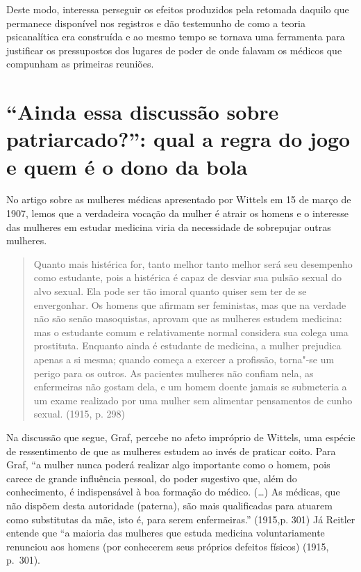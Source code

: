 Deste modo, interessa perseguir os efeitos produzidos pela retomada
daquilo que permanece disponível nos registros e dão testemunho de como
a teoria psicanalítica era construída e ao mesmo tempo se tornava uma
ferramenta para justificar os pressupostos dos lugares de poder de onde
falavam os médicos que compunham as primeiras reuniões.

\section{``Ainda essa discussão sobre patriarcado?'': qual a regra do jogo
e quem é o dono da bola}

No artigo sobre as mulheres médicas apresentado por Wittels em 15 de
março de 1907, lemos que a verdadeira vocação da mulher é atrair os
homens e o interesse das mulheres em estudar medicina viria da
necessidade de sobrepujar outras mulheres.

\begin{quote}
Quanto mais histérica for, tanto melhor tanto melhor será seu desempenho
como estudante, pois a histérica é capaz de desviar sua pulsão sexual do
alvo sexual. Ela pode ser tão imoral quanto quiser sem ter de se
envergonhar. Os homens que afirmam ser feministas, mas que na verdade
não são senão masoquistas, aprovam que as mulheres estudem medicina: mas
o estudante comum e relativamente normal considera sua colega uma
prostituta. Enquanto ainda é estudante de medicina, a mulher prejudica
apenas a si mesma; quando começa a exercer a profissão, torna"-se um
perigo para os outros. As pacientes mulheres não confiam nela, as
enfermeiras não gostam dela, e um homem doente jamais se submeteria a um
exame realizado por uma mulher sem alimentar pensamentos de cunho
sexual. (1915, p. 298)
\end{quote}

Na discussão que segue, Graf, percebe no afeto impróprio de Wittels, uma
espécie de ressentimento de que as mulheres estudem ao invés de praticar
coito. Para Graf, ``a mulher nunca poderá realizar algo importante como
o homem, pois carece de grande influência pessoal, do poder sugestivo
que, além do conhecimento, é indispensável à boa formação do médico.
(\ldots{}) As médicas, que não dispõem desta autoridade (paterna), são mais
qualificadas para atuarem como substitutas da mãe, isto é, para serem
enfermeiras.'' (1915,p. 301) Já Reitler entende que ``a maioria das
mulheres que estuda medicina voluntariamente renunciou aos homens (por
conhecerem seus próprios defeitos físicos) (1915, p.~301).

